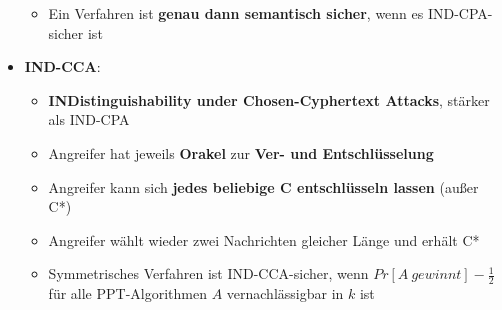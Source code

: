 \begin{itemize}
\begin{itemize}
		\item Ein Verfahren ist \textbf{genau dann semantisch sicher}, wenn es IND-CPA-sicher ist
	\end{itemize}
	\item \textbf{IND-CCA}:
	\begin{itemize}
		\item \textbf{INDistinguishability under Chosen-Cyphertext Attacks}, stärker als IND-CPA
		\item Angreifer hat jeweils \textbf{Orakel} zur \textbf{Ver- und Entschlüsselung}
		\item Angreifer kann sich \textbf{jedes beliebige C entschlüsseln lassen} (außer C*)
		\item Angreifer wählt wieder zwei Nachrichten gleicher Länge und erhält C*
		\item Symmetrisches Verfahren ist IND-CCA-sicher, wenn $Pr[A\ gewinnt] - \frac{1}{2}$ für alle PPT-Algorithmen $A$ vernachlässigbar in $k$ ist
	\end{itemize}
\end{itemize}